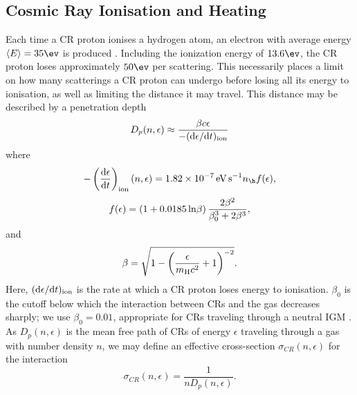 \subsection{Cosmic Ray Ionisation and Heating}
\label{CRchem}

Each time a CR proton ionises a hydrogen atom, an electron with average energy $\langle E \rangle = 35\ev$ is produced \citep{SpitzerTomasko1968}.  Including the ionization energy of $13.6\ev$, the CR proton loses approximately $50\ev$ per scattering. This necessarily places a limit on how many scatterings a CR proton can undergo before losing all its energy to ionisation, as well as limiting the distance it may travel.  This distance may be described by a penetration depth 
\begin{equation}
    D_p(n, \epsilon) \approx \frac{\beta c \epsilon} {-({\rm d}\epsilon / {\rm d}t)_{\rm ion}}
\end{equation}
where \citep{Schlickeiser2002}
\begin{equation}
    - \left( \frac{{\rm d}\epsilon} {{\rm d}t} \right)_{\rm ion}(n, \epsilon)
    = 1.82\times10^{-7}\,{\rm \small eV\,s}^{-1} n_{\h} f(\epsilon),
\end{equation}
\begin{equation}    
    f(\epsilon) = (1 + 0.0185 \,{\rm ln}\beta )\, \frac{2 \beta^2}{\beta_0^3 + 2 \beta^3},
\end{equation}
and 
\begin{equation}
    \beta =  \sqrt{1 - \left( \frac{\epsilon}{m_{\rm \tiny H}c^2}+1 \right)^{-2}}.
\end{equation}
Here, $({\rm d}\epsilon / {\rm d}t)_{\rm ion}$ is the rate at which a CR proton loses energy to ionisation. $\beta_0$ is the cutoff below which the interaction between CRs and the gas decreases sharply; we use $\beta_0=0.01$, appropriate for CRs traveling through a neutral IGM \citep{StacyBromm2007}.
As $D_p(n, \epsilon)$ is the mean free path of CRs of energy $\epsilon$ traveling through a gas with number density $n$, we may define an effective cross-section $\sigma_{CR}(n,\epsilon)$ for the interaction
\begin{equation}
\sigma_{CR}(n,\epsilon) = \frac{1}{n D_p(n, \epsilon)}.
\end{equation}

